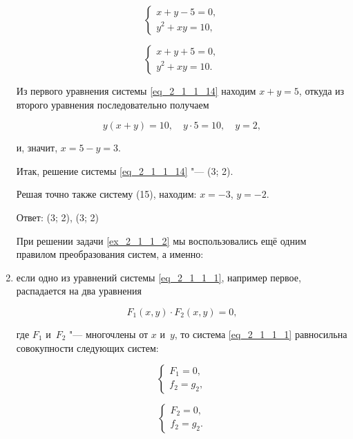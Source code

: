\begin{enumerate}
\begin{equation}\label{eq_2_1_1_14}
\begin{cases}
x + y - 5 = 0, \\
y^{2} + xy = 10,
\end{cases}
\end{equation}

\begin{equation}\label{eq_2_1_1_15}
\begin{cases}
x + y + 5 = 0, \\
y^{2} + xy = 10.
\end{cases}
\end{equation}

Из первого уравнения системы \eqref{eq_2_1_1_14} находим $x + y = 5$,
откуда из второго уравнения последовательно получаем

\begin{equation*}
y(x + y) = 10, \quad y \cdot 5 = 10, \quad y = 2,
\end{equation*}

и, значит, $x = 5 - y = 3$.

Итак, решение системы \eqref{eq_2_1_1_14} "--- (3; 2).

Решая точно также систему (15), находим: $x = -3$, $y = -2$.

Ответ: (3; 2), (3; 2)

При решении задачи \ref{ex_2_1_1_2} мы воспользовались ещё одним правилом
преобразования систем, а именно:

\item \label{lst_2_1_1_4} если одно из уравнений системы \eqref{eq_2_1_1_1},
например первое, распадается на два уравнения

\begin{equation*}
F_{1}(x, y) \cdot F_{2}(x, y) = 0, 
\end{equation*}

где $F_{1}$ и~$F_{2}$ "--- многочлены от $x$ и~$y$, то система \eqref{eq_2_1_1_1}
равносильна совокупности следующих систем:

\begin{equation}\label{eq_2_1_1_16}
\begin{cases}
F_{1} = 0, \\
f_{2} = g_{2},
\end{cases}
\end{equation}

\begin{equation}\label{eq_2_1_1_17}
\begin{cases}
F_{2} = 0, \\
f_{2} = g_{2}.
\end{cases}
\end{equation}


\end{enumerate}
